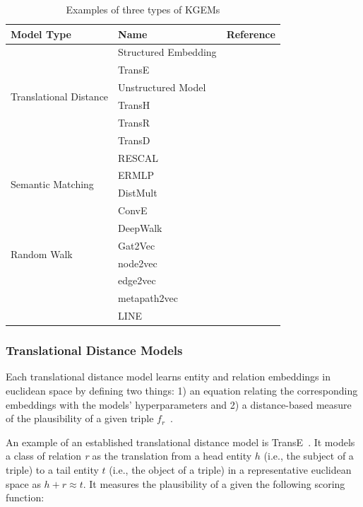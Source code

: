 \begin{table}
    \centering
    \begin{tabular}{ l l l }
        \hline
        Model Type & Name & Reference \\
        \hline
        \multirow{6}{*}{Translational Distance}
        & Structured Embedding & ~\cite{Bordes2011}  \\
        & TransE & ~\cite{Bordes2013} \\
        & Unstructured Model & ~\cite{Bordes2014} \\
        & TransH & ~\cite{Wang2014} \\
        & TransR & ~\cite{Lin2015} \\
        & TransD & ~\cite{Ji2015} \\
        \hline
        \multirow{4}{*}{Semantic Matching}
        & RESCAL & ~\cite{Nickel2011} \\
        & ERMLP & ~\cite{Dong2014} \\
        & DistMult & ~\cite{Yang2014}  \\
        & ConvE & ~\cite{Dettmers2017} \\
        \hline
        \multirow{4}{*}{Random Walk}
        & DeepWalk & ~\cite{Perozzi2014} \\
        & Gat2Vec & ~\cite{Sheikh2018} \\
        & node2vec & ~\cite{Grover2016} \\
        & edge2vec & ~\cite{Gao2018} \\
        & metapath2vec & ~\cite{Dong2017} \\
        & LINE & ~\cite{Tang2015} \\
        \hline
    \end{tabular}
    \caption{Examples of three types of \acp{KGEM}}\label{tab:kgem_examples}
\end{table}

\subsubsection{Translational Distance Models}

Each translational distance model learns entity and relation embeddings in euclidean space by defining two things: 1) an equation relating the corresponding embeddings with the models' hyperparameters and 2) a distance-based measure of the plausibility of a given triple $f_r$~\cite{Wang2017}.

An example of an established translational distance model is TransE~\cite{Bordes2013}.
It models a class of relation \textit{r} as the translation from a head entity $h$ (i.e., the subject of a triple) to a tail entity $t$ (i.e., the object of a triple) in a representative euclidean space as $h + r \approx t$.
It measures the plausibility of a given the following scoring function:

